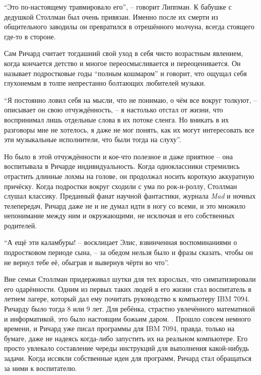 \enquote{Это по-настоящему травмировало его}, -- говорит Липпман. К бабушке с дедушкой Столлман был очень привязан. Именно после их смерти из общительного заводилы он превратился в отрешённого молчуна, всегда стоящего где-то в стороне.

Сам Ричард считает тогдашний свой уход в себя чисто возрастным явлением, когда кончается детство и многое переосмысливается и переоценивается. Он называет подростковые годы \enquote{полным кошмаром} и говорит, что ощущал себя глухонемым в толпе непрестанно болтающих любителей музыки.

\enquote{Я постоянно ловил себя на мысли, что не понимаю, о чём все вокруг толкуют, -- описывает он свою отчуждённость, -- я настолько отстал от жизни, что воспринимал лишь отдельные слова в их потоке сленга. Но вникать в их разговоры мне не хотелось, я даже не мог понять, как их могут интересовать все эти музыкальные исполнители, что были тогда на слуху}.

Но было в этой отчуждённости и кое-что полезное и даже приятное -- она воспитывала в Ричарде индивидуальность. Когда одноклассники стремились отрастить длинные лохмы на голове, он продолжал носить короткую аккуратную причёску. Когда подростки вокруг сходили с ума по рок-н-роллу, Столлман слушал классику. Преданный фанат научной фантастики, журнала \textit{Mad} и ночных телепередач, Ричард даже не и не думал идти в ногу со всеми, и это множило непонимание между ним и окружающими, не исключая и его собственных родителей.

\enquote{А ещё эти каламбуры! -- восклицает Элис, взвинченная воспоминаниями о подростковом периоде сына, -- за обедом нельзя было и фразы сказать, чтобы он не вернул тебе её, обыграв и вывернув чёрти во что}.

Вне семьи Столлман придерживал шутки для тех взрослых, что симпатизировали его одарённости. Одним из первых таких людей в его жизни стал воспитатель в летнем лагере, который дал ему почитать руководство к компьютеру IBM 7094. Ричарду было тогда 8 или 9 лет. Для ребёнка, страстно увлечённого математикой и информатикой, это было настоящим божьим даром. . Прошло совсем немного времени, и Ричард уже писал программы для IBM 7094, правда, только на бумаге, даже не надеясь когда-либо запустить их на реальном компьютере. Его просто увлекало составление череды инструкций для выполнения какой-нибудь задачи. Когда иссякли собственные идеи для программ, Ричард стал обращаться за ними к воспитателю.

